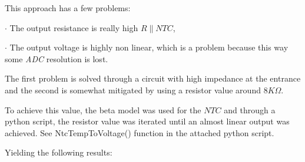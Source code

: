 \documentclass[12pt]{article}
\begin{document}
    This approach  has a few problems: 

    $\cdot$ The output resistance is really high $R\parallel NTC$, 

    $\cdot$ The output voltage is highly non linear, which is a problem because this way some \textit{ADC} resolution is lost.

    The first problem is solved through a circuit with high impedance at the entrance and the second is somewhat mitigated by using a resistor value around $8K \Omega$. 

    To achieve this value, the beta model was used for the $NTC$ and through a python script, the resistor value was iterated until an almost linear output was achieved. See NtcTempToVoltage() function in the attached python script.
    ~
    
    Yielding the following results:
    \label{AFENTCOutV}
    ~
\end{document}
